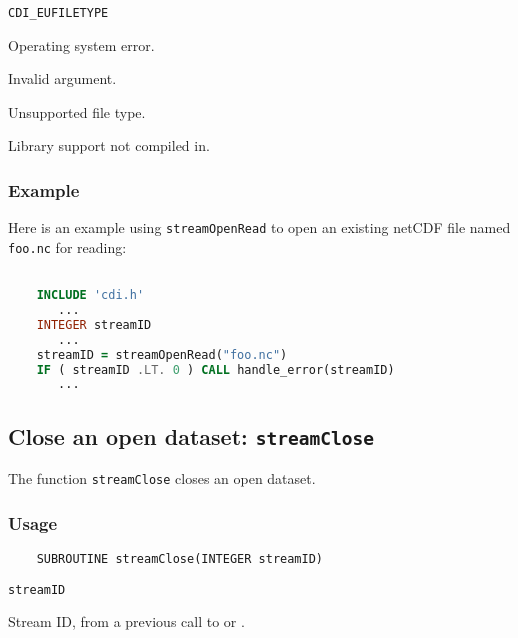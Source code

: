 \hspace*{4mm}\begin{minipage}[]{15cm}
\begin{deflist}{\tt CDI\_EUFILETYPE\ }
\item[{\tt CDI\_ESYSTEM}]
Operating system error.
\item[{\tt CDI\_EINVAL}]
Invalid argument.
\item[{\tt CDI\_EUFILETYPE}]
Unsupported file type.
\item[{\tt CDI\_ELIBNAVAIL}]
Library support not compiled in.
\end{deflist}
\end{minipage}


\subsubsection*{Example}

Here is an example using {\tt streamOpenRead} to open an existing netCDF
file named {\tt foo.nc} for reading:

\begin{lstlisting}[language=Fortran, backgroundcolor=\color{pyellow}, basicstyle=\small, columns=flexible]

    INCLUDE 'cdi.h'
       ...
    INTEGER streamID
       ...
    streamID = streamOpenRead("foo.nc")
    IF ( streamID .LT. 0 ) CALL handle_error(streamID)
       ...
\end{lstlisting}


\subsection{Close an open dataset: {\tt streamClose}}
\label{streamClose}

The function {\tt streamClose} closes an open dataset.

\subsubsection*{Usage}

\begin{verbatim}
    SUBROUTINE streamClose(INTEGER streamID)
\end{verbatim}

\hspace*{4mm}\begin{minipage}[]{15cm}
\begin{deflist}{\tt streamID\ }
\item[{\tt streamID}]
Stream ID, from a previous call to {} or {}.

\end{deflist}
\end{minipage}


